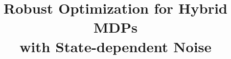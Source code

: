 \documentclass[a0, landscape]{nictalaymanlandscape}
\title{Robust Optimization for Hybrid MDPs \\with State-dependent Noise}
\begin{document}
\makeposter
\end{document}
